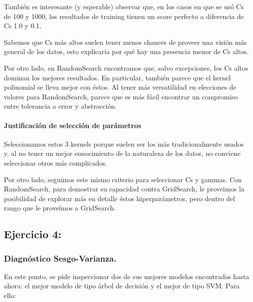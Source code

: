 \documentclass[11pt]{article}
\begin{document}
También es interesante (y esperable) observar que, en los casos en que
se usó Cs de 100 y 1000, los resultados de training tienen un score
perfecto a diferencia de Cs 1.0 y 0.1.

Sabemos que Cs más altos suelen tener menos chances de proveer una
visión más general de los datos, esto explicaría por qué hay una
presencia menor de Cs altos.

Por otro lado, en RandomSearch encontramos que, salvo excepciones, los
Cs altos dominan los mejores resultados. En particular, también parece
que el kernel polinomial se lleva mejor con éstos. Al tener más
versatilidad en elecciones de valores para RandomSearch, parece que es
más fácil encontrar un compromiso entre tolerancia a error y
abstracción.

\paragraph{Justificación de selección de
parámetros}\label{justificaciuxf3n-de-selecciuxf3n-de-paruxe1metros}

Seleccionamos estos 3 kernels porque suelen ser los más tradicionalmente
usados y, al no tener un mejor conocimiento de la naturaleza de los
datos, no conviene seleccionar otros más complicados.

Por otro lado, seguimos este mismo criterio para seleccionar Cs y
gammas. Con RandomSearch, para demostrar su capacidad contra GridSearch,
le proveimos la posibilidad de explorar más en detalle éstos
hiperparámetros, pero dentro del rango que le proveímos a GridSearch.

    \subsection{Ejercicio 4:}\label{ejercicio-4}

\subsubsection{Diagnóstico
Sesgo-Varianza.}\label{diagnuxf3stico-sesgo-varianza.}

En este punto, se pide inspeccionar dos de sus mejores modelos
encontrados hasta ahora: el mejor modelo de tipo árbol de decisión y el
mejor de tipo SVM. Para ello:
\end{document}
